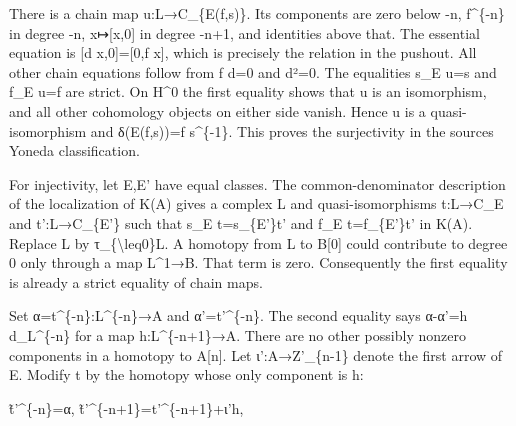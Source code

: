 There is a chain map u:\allowbreak{}L\allowbreak{}→C\_\allowbreak{}\{E(f,\allowbreak{}s)\allowbreak{}\}. Its components are zero below -n,\allowbreak{} f\^{}\{-n\} in degree -n,\allowbreak{} x\allowbreak{}↦[x,\allowbreak{}0]\allowbreak{} in degree -n\allowbreak{}+1,\allowbreak{} and identities above that. The essential equation is {[}d x,\allowbreak{}0]\allowbreak{}\allowbreak{}=[0,\allowbreak{}f x]\allowbreak{},\allowbreak{} which is precisely the relation in the pushout. All other chain equations follow from f d\allowbreak{}=0 and d²\allowbreak{}=0. The equalities s\_\allowbreak{}E u\allowbreak{}=s and f\_\allowbreak{}E u\allowbreak{}=f are strict. On H\^{}0 the first equality shows that u is an isomorphism,\allowbreak{} and all other cohomology objects on either side vanish. Hence u is a quasi-isomorphism and δ(E(f,\allowbreak{}s)\allowbreak{})\allowbreak{}\allowbreak{}=f s\^{}\{-1\}. This proves the surjectivity in the source\textquotesingle s Yoneda classification.

For injectivity,\allowbreak{} let E,\allowbreak{}E' have equal classes. The common-denominator description of the localization of K(A)\allowbreak{} gives a complex L and quasi-isomorphisms t:\allowbreak{}L\allowbreak{}→C\_\allowbreak{}E and t':\allowbreak{}L\allowbreak{}→C\_\allowbreak{}\{E'\} such that s\_\allowbreak{}E t\allowbreak{}=s\_\allowbreak{}\{E'\}t' and f\_\allowbreak{}E t\allowbreak{}=f\_\allowbreak{}\{E'\}t' in K(A)\allowbreak{}. Replace L by τ\_\allowbreak{}\{\textbackslash{}leq0\}L. A homotopy from L to B[0]\allowbreak{} could contribute to degree 0 only through a map L\textasciicircum{}1\allowbreak{}→B. That term is zero. Consequently the first equality is already a strict equality of chain maps.

Set α\allowbreak{}=t\textasciicircum{}\{-n\}:\allowbreak{}L\textasciicircum{}\{-n\}\allowbreak{}→A and α'\allowbreak{}=t'\textasciicircum{}\{-n\}. The second equality says α-α'\allowbreak{}=h d\_\allowbreak{}L\textasciicircum{}\{-n\} for a map h:\allowbreak{}L\textasciicircum{}\{-n\allowbreak{}+1\}\allowbreak{}→A. There are no other possibly nonzero components in a homotopy to A[n]\allowbreak{}. Let ι':\allowbreak{}A\allowbreak{}→Z'\_\allowbreak{}\{n-1\} denote the first arrow of E\textquotesingle. Modify t\textquotesingle{} by the homotopy whose only component is h:\allowbreak{}

t̃'\textasciicircum{}\{-n\}\allowbreak{}=α,\allowbreak{} t̃'\textasciicircum{}\{-n\allowbreak{}+1\}\allowbreak{}=t'\textasciicircum{}\{-n\allowbreak{}+1\}\allowbreak{}+ι'h,\allowbreak{}


